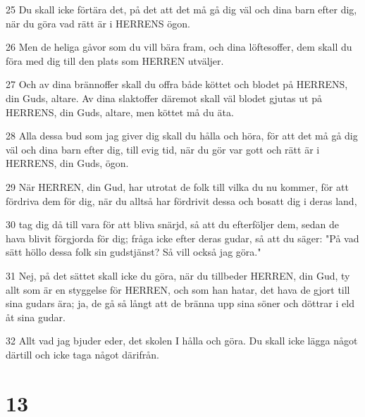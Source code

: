\par 25 Du skall icke förtära det, på det att det må gå dig väl och dina barn efter dig, när du göra vad rätt är i HERRENS ögon.
\par 26 Men de heliga gåvor som du vill bära fram, och dina löftesoffer, dem skall du föra med dig till den plats som HERREN utväljer.
\par 27 Och av dina brännoffer skall du offra både köttet och blodet på HERRENS, din Guds, altare. Av dina slaktoffer däremot skall väl blodet gjutas ut på HERRENS, din Guds, altare, men köttet må du äta.
\par 28 Alla dessa bud som jag giver dig skall du hålla och höra, för att det må gå dig väl och dina barn efter dig, till evig tid, när du gör var gott och rätt är i HERRENS, din Guds, ögon.
\par 29 När HERREN, din Gud, har utrotat de folk till vilka du nu kommer, för att fördriva dem för dig, när du alltså har fördrivit dessa och bosatt dig i deras land,
\par 30 tag dig då till vara för att bliva snärjd, så att du efterföljer dem, sedan de hava blivit förgjorda för dig; fråga icke efter deras gudar, så att du säger: "På vad sätt höllo dessa folk sin gudstjänst? Så vill också jag göra."
\par 31 Nej, på det sättet skall icke du göra, när du tillbeder HERREN, din Gud, ty allt som är en styggelse för HERREN, och som han hatar, det hava de gjort till sina gudars ära; ja, de gå så långt att de bränna upp sina söner och döttrar i eld åt sina gudar.
\par 32 Allt vad jag bjuder eder, det skolen I hålla och göra. Du skall icke lägga något därtill och icke taga något därifrån.

\chapter{13}

